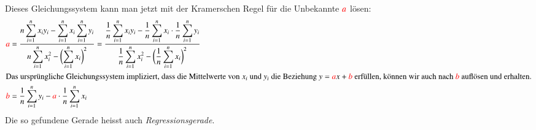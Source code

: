 Dieses Gleichungssystem kann man jetzt mit der Kramerschen Regel für die
Unbekannte ${\color{red}a}$ lösen:
\begin{align*}
{\color{red}a}
&=
\frac{\displaystyle
n\sum_{i=1}^n x_iy_i-\sum_{i=1}^nx_i\sum_{i=1}^ny_i
}{\displaystyle
n\sum_{i=1}^n x_i^2 -\biggl(\sum_{i=1}^n x_i\biggr)^2
}
=
\frac{\displaystyle
\frac1n\sum_{i=1}^n x_iy_i-\frac1n\sum_{i=1}^nx_i\cdot \frac1n\sum_{i=1}^ny_i
}{\displaystyle
\frac1n\sum_{i=1}^n x_i^2 -\biggl(\frac1n\sum_{i=1}^n x_i\biggr)^2
}
\\
\intertext{Das ursprüngliche Gleichungssystem impliziert, dass die Mittelwerte
von $x_i$ und $y_i$ die Beziehung $y={\color{red}a}x+{\color{red}b}$ erfüllen,
können wir auch nach ${\color{red}b}$ auflösen und erhalten.}
{\color{red}b}
&=
\frac1n\sum_{i=1}^n y_i
-{\color{red}a}
\cdot
\frac1n\sum_{i=1}^n x_i
\end{align*}
Die so gefundene Gerade heisst auch {\em Regressionsgerade}.


